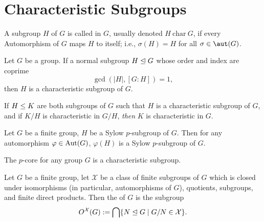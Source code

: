 \section{Characteristic Subgroups}

\begin{definition}
A subgroup $H$ of $G$ is called  in $G$, usually
denoted $H~\mathrm{char}~G$, if every Automorphism of $G$ maps $H$ to
itself; i.e., $\sigma(H)=H$ for all $\sigma\in\aut(G)$.
\end{definition}

\begin{theorem}
Let $G$ be a group. If a normal subgroup $H\trianglelefteq G$ whose
order and index are coprime
\begin{equation*}
\gcd(|H|, [G:H])=1,
\end{equation*}
then $H$ is a characteristic subgroup of $G$.
\end{theorem}

\begin{theorem}
If  $H\leq K$ are both subgroups of $G$ such that $H$ is
a characteristic subgroup of $G$, and if $K/H$ is characteristic in
$G/H$, \emph{then} $K$ is characteristic in $G$.
\end{theorem}

\begin{lemma}
Let $G$ be a finite group, $H$ be a Sylow $p$-subgroup of $G$. Then for
any automorphism $\varphi\in\operatorname{Aut}(G)$, $\varphi(H)$ is a Sylow
$p$-subgroup of $G$.
\end{lemma}

\begin{theorem}
The $p$-core for any group $G$ is a characteristic subgroup.
\end{theorem}

\begin{definition}\label{defn:pure-math:X-residual}
Let $G$ be a finite group, let $\mathcal{X}$ be a class of finite
subgroups of $G$ which is closed under isomorphisms (in particular,
automorphisms of $G$), quotients, subgroups, and finite direct products.
Then the  of $G$ is the subgroup
\begin{equation}
  O^{\mathcal{X}}(G) := \bigcap\{N\trianglelefteq G\mid G/N\in\mathcal{X}\}.
\end{equation}
\end{definition}

